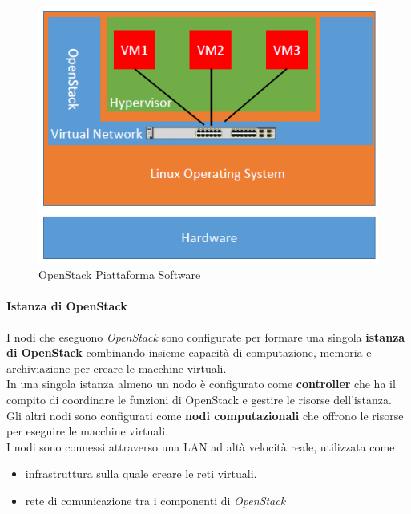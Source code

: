 \documentclass{article}
\begin{document}
\begin{figure}[H]
    \centering
    \includegraphics[scale=0.5]{img/os_platform.png}
    \caption{OpenStack Piattaforma Software}
\end{figure}\noindent

\paragraph{Istanza di OpenStack}
I nodi che eseguono \textit{OpenStack} sono configurate per formare una singola \textbf{istanza di OpenStack} combinando insieme capacità di computazione, memoria e archiviazione per creare le macchine virtuali.\\
In una singola istanza almeno un nodo è configurato come \textbf{controller} che ha il compito di coordinare le funzioni di OpenStack e gestire le risorse dell'istanza. Gli altri nodi sono configurati come \textbf{nodi computazionali} che offrono le risorse per eseguire le macchine virtuali. \\
I nodi sono connessi attraverso una LAN ad altà velocità reale, utilizzata come
\begin{itemize}
    \item infrastruttura sulla quale creare le reti virtuali.
    \item rete di comunicazione tra i componenti di \textit{OpenStack}
\end{itemize}
\end{document}
